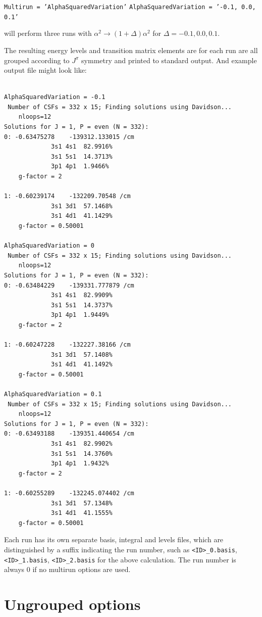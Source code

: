 \documentclass{report}
\begin{document}
\texttt{Multirun = 'AlphaSquaredVariation'}
\texttt{AlphaSquaredVariation = '-0.1, 0.0, 0.1'}

will perform three runs with $\alpha^2 \to (1 + \Delta)\alpha^2$ for $\Delta = -0.1, 0.0, 0.1$.

The resulting energy levels and transition matrix elements are for each run are all grouped according to
$J^{\pi}$ symmetry and printed to standard output. And example output file might look like:

\begin{verbatim}

AlphaSquaredVariation = -0.1
 Number of CSFs = 332 x 15; Finding solutions using Davidson...
    nloops=12
Solutions for J = 1, P = even (N = 332):
0: -0.63475278    -139312.133015 /cm
             3s1 4s1  82.9916%
             3s1 5s1  14.3713%
             3p1 4p1  1.9466%
    g-factor = 2

1: -0.60239174    -132209.70548 /cm
             3s1 3d1  57.1468%
             3s1 4d1  41.1429%
    g-factor = 0.50001

AlphaSquaredVariation = 0
 Number of CSFs = 332 x 15; Finding solutions using Davidson...
    nloops=12
Solutions for J = 1, P = even (N = 332):
0: -0.63484229    -139331.777879 /cm
             3s1 4s1  82.9909%
             3s1 5s1  14.3737%
             3p1 4p1  1.9449%
    g-factor = 2

1: -0.60247228    -132227.38166 /cm
             3s1 3d1  57.1408%
             3s1 4d1  41.1492%
    g-factor = 0.50001

AlphaSquaredVariation = 0.1
 Number of CSFs = 332 x 15; Finding solutions using Davidson...
    nloops=12
Solutions for J = 1, P = even (N = 332):
0: -0.63493188    -139351.440654 /cm
             3s1 4s1  82.9902%
             3s1 5s1  14.3760%
             3p1 4p1  1.9432%
    g-factor = 2

1: -0.60255289    -132245.074402 /cm
             3s1 3d1  57.1348%
             3s1 4d1  41.1555%
    g-factor = 0.50001

\end{verbatim}

Each run has its own separate basis, integral and levels files, which are distinguished by a suffix
indicating the run number, such as \texttt{<ID>\_0.basis}, \texttt{<ID>\_1.basis}, 
\texttt{<ID>\_2.basis} for the above calculation. The run number is always 0 if no multirun options are
used.

\section{Ungrouped options}
\label{sec:ungrouped}
\end{document}
